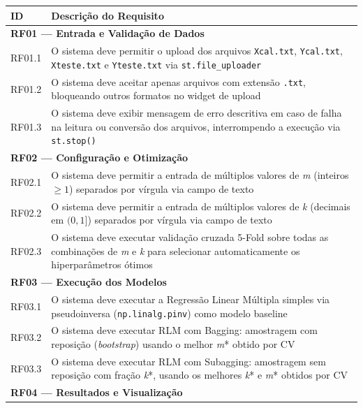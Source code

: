 \documentclass[12pt,a4paper]{article}
\begin{document}
\begin{quadro}[!ht]
\centering
\small
\caption{Especificação dos requisitos funcionais (RF01--RF05)}
\label{quadro:rfs}
\begin{threeparttable}
\begin{tabularx}{\textwidth}{|l|X|} \hline
\textbf{ID} & \textbf{Descrição do Requisito} \\ \hline
\multicolumn{2}{|l|}{\textbf{RF01 --- Entrada e Validação de Dados}} \\ \hline
RF01.1 & O sistema deve permitir o upload dos arquivos \texttt{Xcal.txt}, \texttt{Ycal.txt}, \texttt{Xteste.txt} e \texttt{Yteste.txt} via \texttt{st.file\_uploader} \\ \hline
RF01.2 & O sistema deve aceitar apenas arquivos com extensão \texttt{.txt}, bloqueando outros formatos no widget de upload \\ \hline
RF01.3 & O sistema deve exibir mensagem de erro descritiva em caso de falha na leitura ou conversão dos arquivos, interrompendo a execução via \texttt{st.stop()} \\ \hline
\multicolumn{2}{|l|}{\textbf{RF02 --- Configuração e Otimização}} \\ \hline
RF02.1 & O sistema deve permitir a entrada de múltiplos valores de \textit{m} (inteiros $\ge 1$) separados por vírgula via campo de texto \\ \hline
RF02.2 & O sistema deve permitir a entrada de múltiplos valores de \textit{k} (decimais em $(0,1]$) separados por vírgula via campo de texto \\ \hline
RF02.3 & O sistema deve executar validação cruzada 5-Fold sobre todas as combinações de \textit{m} e \textit{k} para selecionar automaticamente os hiperparâmetros ótimos \\ \hline
\multicolumn{2}{|l|}{\textbf{RF03 --- Execução dos Modelos}} \\ \hline
RF03.1 & O sistema deve executar a Regressão Linear Múltipla simples via pseudoinversa (\texttt{np.linalg.pinv}) como modelo baseline \\ \hline
RF03.2 & O sistema deve executar RLM com Bagging: amostragem com reposição (\textit{bootstrap}) usando o melhor \textit{m}* obtido por CV \\ \hline
RF03.3 & O sistema deve executar RLM com Subagging: amostragem sem reposição com fração \textit{k}*, usando os melhores \textit{k}* e \textit{m}* obtidos por CV \\ \hline
\multicolumn{2}{|l|}{\textbf{RF04 --- Resultados e Visualização}} \\ \hline

\end{tabularx}
\end{threeparttable}
\end{quadro}
\end{document}
